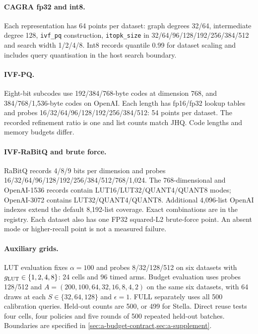 \paragraph{CAGRA fp32 and int8.}
Each representation has 64 points per dataset: graph degrees 32/\allowbreak{}64,
intermediate degree 128, \texttt{ivf\_pq} construction,
\texttt{itopk\_size} in 32/\allowbreak{}64/\allowbreak{}96/\allowbreak{}128/\allowbreak{}192/\allowbreak{}256/\allowbreak{}384/\allowbreak{}512 and search width
1/\allowbreak{}2/\allowbreak{}4/\allowbreak{}8. Int8 records quantile 0.99 for dataset scaling and includes
query quantisation in the host search boundary.

\paragraph{IVF-PQ.}
Eight-bit subcodes use 192/\allowbreak{}384/\allowbreak{}768-byte codes at dimension 768,
and 384/\allowbreak{}768/\allowbreak{}1,536-byte codes on OpenAI. Each length has fp16/fp32
lookup tables and probes 16/\allowbreak{}32/\allowbreak{}64/\allowbreak{}96/\allowbreak{}128/\allowbreak{}192/\allowbreak{}256/\allowbreak{}384/\allowbreak{}512:
54 points per dataset. The recorded refinement ratio is one and list
counts match JHQ. Code lengths and memory budgets differ.

\paragraph{IVF-RaBitQ and brute force.}
RaBitQ records 4/\allowbreak{}8/\allowbreak{}9 bits per dimension and probes
16/\allowbreak{}32/\allowbreak{}64/\allowbreak{}96/\allowbreak{}128/\allowbreak{}192/\allowbreak{}256/\allowbreak{}384/\allowbreak{}512/\allowbreak{}768/\allowbreak{}1,024. The 768-dimensional and
OpenAI-1536 records contain LUT16/LUT32/QUANT4/QUANT8 modes;
OpenAI-3072 contains LUT32/QUANT4/QUANT8. Additional 4,096-list OpenAI
indexes extend the default 8,192-list coverage. Exact combinations are
in the registry. Each dataset also has one FP32 squared-L2 brute-force
point. An absent mode or higher-recall point is not a measured failure.

\paragraph{Auxiliary grids.}
LUT evaluation fixes $\alpha=100$ and probes 8/\allowbreak{}32/\allowbreak{}128/\allowbreak{}512 on six
datasets with $g_{\mathrm{LUT}}\in\{1,2,4,8\}$: 24 cells and 96 timed arms.
Budget evaluation uses probes 128/\allowbreak{}512 and
$A=(200,100,64,32,16,8,4,2)$ on the same six datasets, with 64 draws
at each $S\in\{32,64,128\}$ and $\epsilon=1$. FULL separately uses
all 500 calibration queries. Held-out counts are 500, or 499 for
Stella. Direct reuse tests four cells, four policies and five rounds
of 500 repeated held-out batches. Boundaries are specified in
\cref{sec:a-budget-contract,sec:a-supplement}.

